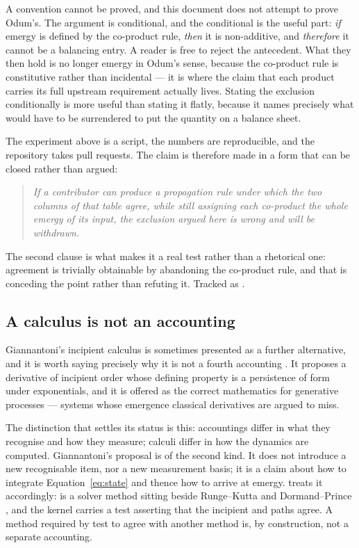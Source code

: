 \documentclass[11pt,a4paper]{article}
\begin{document}
A convention cannot be proved, and this document does not attempt to prove Odum's. The argument is conditional, and the conditional is the useful part: \emph{if} emergy is defined by the co-product rule, \emph{then} it is non-additive, and \emph{therefore} it cannot be a balancing entry. A reader is free to reject the antecedent. What they then hold is no longer emergy in Odum's sense, because the co-product rule is constitutive rather than incidental --- it is where the claim that each product carries its full upstream requirement actually lives. Stating the exclusion conditionally is more useful than stating it flatly, because it names precisely what would have to be surrendered to put the quantity on a balance sheet.

The experiment above is a script, the numbers are reproducible, and the repository takes pull requests. The claim is therefore made in a form that can be closed rather than argued:

\begin{quote}
\emph{If a contributor can produce a propagation rule under which the two columns of that table agree, while still assigning each co-product the whole emergy of its input, the exclusion argued here is wrong and will be withdrawn.}
\end{quote}

The second clause is what makes it a real test rather than a rhetorical one: agreement is trivially obtainable by abandoning the co-product rule, and that is conceding the point rather than refuting it. Tracked as .

\subsection{A calculus is not an accounting}
\label{sec:idc}

Giannantoni's incipient calculus is sometimes presented as a further alternative, and it is worth saying precisely why it is not a fourth accounting \citep{giannantoni2006,giannantoni2023}. It proposes a derivative of incipient order whose defining property is a persistence of form under exponentials, and it is offered as the correct mathematics for generative processes --- systems whose emergence classical derivatives are argued to miss.

The distinction that settles its status is this: accountings differ in what they recognise and how they measure; calculi differ in how the dynamics are computed. Giannantoni's proposal is of the second kind. It does not introduce a new recognisable item, nor a new measurement basis; it is a claim about how to integrate Equation~\eqref{eq:state} and thence how to arrive at emergy. \gssk{} treats it accordingly:  is a solver method sitting beside Runge--Kutta and Dormand--Prince \citep{dormand1980}, and the kernel carries a test asserting that the incipient and  paths agree. A method required by test to agree with another method is, by construction, not a separate accounting.
\end{document}

